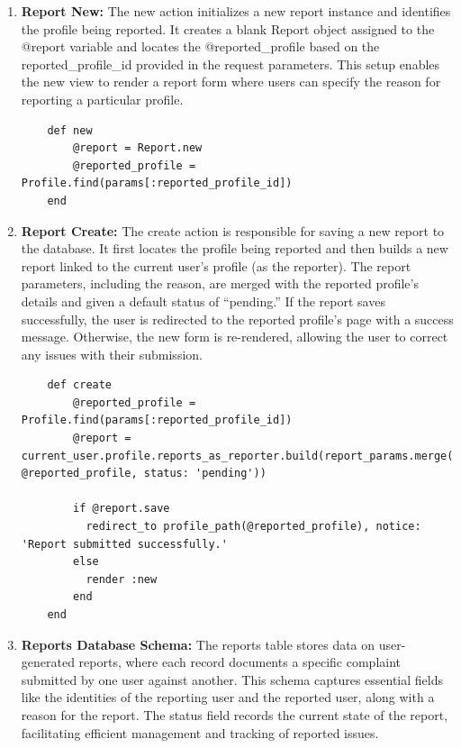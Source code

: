 \begin{enumerate}
    \item \textbf{Report New:} 
    The new action initializes a new report instance and identifies the profile being reported. It creates a blank Report object assigned to the @report variable and locates the @reported\_profile based on the reported\_profile\_id provided in the request parameters. This setup enables the new view to render a report form where users can specify the reason for reporting a particular profile.
    \begin{lstlisting}
    def new
        @report = Report.new
        @reported_profile = Profile.find(params[:reported_profile_id])
    end
    \end{lstlisting}

    \newpage
    \item \textbf{Report Create:} 
    The create action is responsible for saving a new report to the database. It first locates the profile being reported and then builds a new report linked to the current user’s profile (as the reporter). The report parameters, including the reason, are merged with the reported profile’s details and given a default status of “pending.” If the report saves successfully, the user is redirected to the reported profile’s page with a success message. Otherwise, the new form is re-rendered, allowing the user to correct any issues with their submission.
    \begin{lstlisting}
    def create
        @reported_profile = Profile.find(params[:reported_profile_id])
        @report = current_user.profile.reports_as_reporter.build(report_params.merge(reported_profile: @reported_profile, status: 'pending'))
    
        if @report.save
          redirect_to profile_path(@reported_profile), notice: 'Report submitted successfully.'
        else
          render :new
        end
    end
    \end{lstlisting}

    \newpage
    \item \textbf{Reports Database Schema:}
    The reports table stores data on user-generated reports, where each record documents a specific complaint submitted by one user against another. This schema captures essential fields like the identities of the reporting user and the reported user, along with a reason for the report. The status field records the current state of the report, facilitating efficient management and tracking of reported issues.


\end{enumerate}
